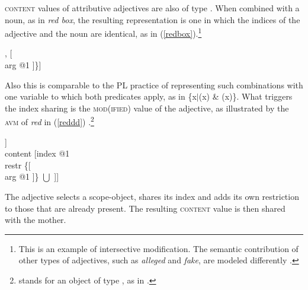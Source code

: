 \documentclass[output=paper
                ,modfonts
                ,nonflat
	        ,collection
	        ,collectionchapter
	        ,collectiontoclongg
 	        ,biblatex
                ,babelshorthands
                ,newtxmath
                ,draftmode
                ,colorlinks, citecolor=brown
]{./langsci/langscibook}
\begin{document}
\textsc{content} values of attributive adjectives are also of type . 
When combined with a noun, as in \emph{red box}, the resulting representation 
is one in which the indices of the adjective and the noun are identical, as in 
(\ref{redbox}).\footnote{This is an example of intersective modification. 
The semantic contribution of other types of adjectives, such as  
\emph{alleged} and \emph{fake}, are modeled differently \citep[330--331]{ps2}.}   

\begin{exe} 
\ex\label{redbox} 
\begin{avm}
[\type{scope-obj}         \\
 index @1                \\
 restr \{ [\type{red}   \\
             arg @1 ],
            [   \\
             arg @1 ]\}]
\end{avm}
\end{exe}

\noindent
Also this is comparable to the PL practice of representing such 
combinations with one variable to which both predicates apply, as in 
\{x$|$(x) \& (x)\}. What triggers the index sharing is 
the \textsc{mod(ified)} value of the adjective, as illustrated by the \textsc{avm} of 
\emph{red} in (\ref{reddd}) \citep[55]{ps2}.\footnote{\avmbox{$\Sigma$} 
stands for an object of type , as in \citet{GS00}.} 

\begin{exe} 
\ex\label{reddd}
\begin{avm}
[cat|head [\type{adjective}                               \\
           mod|loc|content [\type{scope-obj}            \\
                            index @1                   \\
                            restr \avmbox{$\Sigma$} ]] \\
 content [index @1                                     \\
          restr \{[                         \\
                     arg @1 ]\} $\bigcup$ \avmbox{$\Sigma$} ]]
\end{avm}
\end{exe}

\noindent
The adjective selects a scope-object, shares its index and adds its own 
restriction to those that are already present. The resulting \textsc{content} 
value is then shared with the mother.
\end{document}
